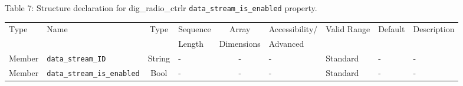 \documentclass{article}
\def\comp{dig\_radio\_ctrlr}
\begin{document}
\begin{landscape}
	\noindent Table \hypertarget{tab7}{7}: Structure declaration for \comp{} \verb+data_stream_is_enabled+ property.
	\begin{scriptsize}
		\noindent\begin{longtable}{|p{1.8cm}|p{3.6cm}|c|p{4cm}|c|p{2cm}|p{1.7cm}|p{0.8cm}|p{4.81cm}|}
			\hline
			\rowcolor{blue}
			Type         & Name                                & Type & Sequence & Array      & Accessibility/ & Valid Range  & Default & Description                                                                                                                                                                                                                       \\
			\rowcolor{blue}
			             &                                     &      & Length   & Dimensions & Advanced       &              &         &                                                                                                                                                                                                                             \\
			\hline
			Member       & \verb+data_stream_ID+               & String& -       & -          & -              & Standard     & -       & - \\
			\hline
			Member       & \verb+data_stream_is_enabled+       & Bool& -       & -          & -              & Standard & -       & - \\
			\hline
		\end{longtable}
	\end{scriptsize}


\end{landscape}
\end{document}
